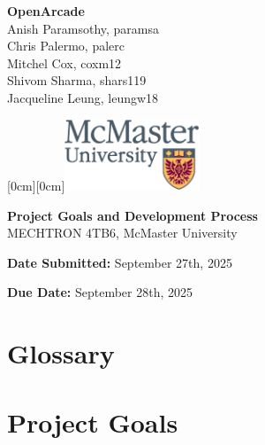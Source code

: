 \documentclass[a4]{article}
\date{\today}
\begin{document}
\begin{titlepage}

    \hspace*{0mm}\textbf{\Large OpenArcade}\\
    \hspace*{0mm} \large Anish Paramsothy, paramsa\\
    \hspace*{0mm} \large Chris Palermo, palerc\\
    \hspace*{0mm} \large Mitchel Cox, coxm12\\
    \hspace*{0mm} \large Shivom Sharma, shars119\\
    \hspace*{0mm} \large Jacqueline Leung, leungw18

    \hspace*{\textwidth} 
    \hspace{-4cm} 
    \vspace{-2cm} 
    \raisebox{1cm}[0cm][0cm]{\includegraphics[width=4cm]{m24-col_png.png}}

    \vspace{7cm} 
    
    
    \begin{center}
        \Huge \textbf{Project Goals and Development Process} \\[1em]
        \Large MECHTRON 4TB6, McMaster University
    \end{center}
    \vspace{7cm}
    
    \hspace*{0mm} \textbf{\large Date Submitted:} September 27th, 2025

    \hspace*{0mm} \textbf{\large Due Date:} September 28th, 2025
\end{titlepage}
\tableofcontents

\clearpage
\section{Glossary}
\section{Project Goals}
\end{document}
